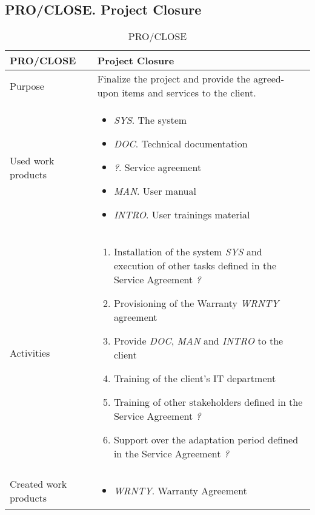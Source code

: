 \subsection{PRO/CLOSE. Project Closure}
\begin{table}[]
\begin{tabular}{l|p{}}
\hline
\textbf{PRO/CLOSE}               & \textbf{Project Closure} \\ \hline
Purpose & Finalize the project and provide the agreed-upon items and services to the client.\\ \hline
Used work products    &      
\begin{itemize}
    \item \textit{SYS}. The system
    \item \textit{DOC}. Technical documentation
    \item \textit{?}. Service agreement
    \item \textit{MAN}. User manual
    \item \textit{INTRO}. User trainings material
\end{itemize}
\\ \hline
Activities            &   
\begin{enumerate}
 \item Installation of the system \textit{SYS} and execution of other tasks defined in the Service Agreement \textit{?}
 \item Provisioning of the Warranty \textit{WRNTY} agreement
 \item Provide \textit{DOC}, \textit{MAN} and \textit{INTRO} to the client
 \item Training of the client's IT department
 \item Training of other stakeholders defined in the Service Agreement \textit{?}
 \item Support over the adaptation period defined in the Service Agreement \textit{?}
\end{enumerate}
\\ \hline
Created work products &     
\begin{itemize}
    \item \textit{WRNTY}. Warranty Agreement
\end{itemize}
\end{tabular}
\caption{PRO/CLOSE}
\label{pro/close}
\end{table}




